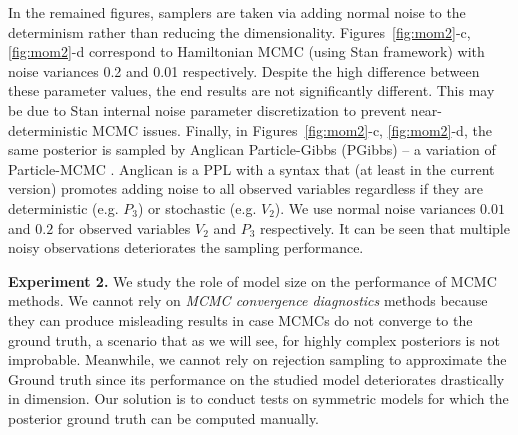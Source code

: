 \documentclass{article}
\begin{document}
{In the remained figures, samplers are taken via adding normal noise to the determinism rather than reducing the dimensionality.
Figures~\ref{fig:mom2}-c, \ref{fig:mom2}-d
correspond to Hamiltonian MCMC (using Stan framework) 
with noise variances 0.2 and 0.01 respectively. 
Despite the high difference between these parameter values, the end results are not significantly different. 
This may be due to Stan
internal noise parameter discretization to prevent near-deterministic MCMC issues. 
Finally, in Figures~\ref{fig:mom2}-c, \ref{fig:mom2}-d, the same posterior is sampled by Anglican
Particle-Gibbs (PGibbs) -- a variation of Particle-MCMC \cite{andrieu2010particle}. 
Anglican \cite{wood2014new} is a PPL with a syntax that (at least in the current version) promotes adding noise to all observed variables regardless if they are deterministic 
(e.g. $P_3$) or stochastic (e.g. $V_2$). 
We use normal noise variances $0.01$ and $0.2$ for observed variables $V_2$  and $P_3$ respectively.
It can be seen that multiple noisy observations deteriorates the sampling performance.

\textbf{Experiment 2.} %
We study the role of model size on the performance of MCMC methods.
We cannot rely on \emph{MCMC convergence diagnostics} methods \cite{cowles1996markov} because they can produce misleading results in case MCMCs do not converge to the ground truth, a scenario that as we will see, for highly complex posteriors is not improbable.
Meanwhile, we cannot rely on rejection sampling to approximate the Ground truth since its performance on the studied model deteriorates drastically in dimension.
Our solution is to conduct tests on symmetric models for which the posterior ground truth can be computed manually.

}
\end{document}
